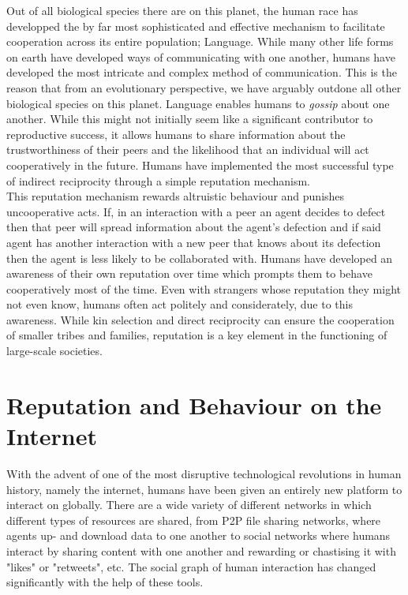 \documentclass[11pt,a4paper]{article}
\theoremstyle{definition}
\theoremstyle{theorem}
\begin{document}
\noindent{}Out of all biological species there are on this planet, the human race has developped the by far most sophisticated and effective mechanism to facilitate cooperation across its entire population; Language. While many other life forms on earth have developed ways of communicating with one another, humans have developed the most intricate and complex method of communication. This is the reason that from an evolutionary perspective, we have arguably outdone all other biological species on this planet. Language enables humans to {\it gossip} about one another. While this might not initially seem like a significant contributor to reproductive success, it allows humans to share information about the trustworthiness of their peers and the likelihood that an individual will act cooperatively in the future. Humans have implemented the most successful type of indirect reciprocity through a simple reputation mechanism. \vspace{1em}\\

\noindent{}This reputation mechanism rewards altruistic behaviour and punishes uncooperative acts. If, in an interaction with a peer an agent decides to defect then that peer will spread information about the agent's defection and if said agent has another interaction with a new peer that knows about its defection then the agent is less likely to be collaborated with. Humans have developed an awareness of their own reputation over time which prompts them to behave cooperatively most of the time. Even with strangers whose reputation they might not even know, humans often act politely and considerately, due to this awareness. While kin selection and direct reciprocity can ensure the cooperation of smaller tribes and families, reputation is a key element in the functioning of large-scale societies. \vspace{1em}\\

\section{Reputation and Behaviour on the Internet}
\label{sec:Reputation and Behaviour on the Internet}
\noindent{}With the advent of one of the most disruptive technological revolutions in human history, namely the internet, humans have been given an entirely new platform to interact on globally. There are a wide variety of different networks in which different types of resources are shared, from P2P file sharing networks, where agents up- and download data to one another to social networks where humans interact by sharing content with one another and rewarding or chastising it with "likes" or "retweets", etc. The social graph of human interaction has changed significantly with the help of these tools.\vspace{1em}\\
\end{document}
